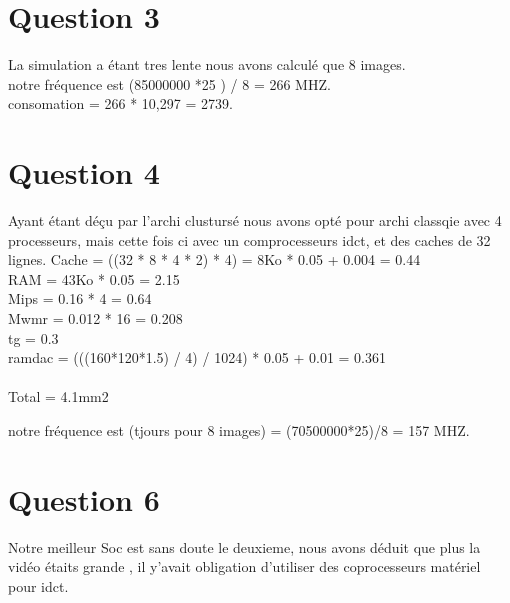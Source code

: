 \documentclass[12pt]{article}
\begin{document}
\section*{Question 3}
La simulation a étant tres lente nous avons calculé que 8 images.\\
	notre fréquence est (85000000 *25 ) / 8 = 266 MHZ.\\
	consomation = 266 * 10,297 = 2739.
	
\section*{Question 4}
Ayant étant déçu par l'archi clustursé nous avons opté pour archi classqie avec 4 processeurs, mais cette fois ci avec un comprocesseurs idct, et des caches de 32 lignes.
Cache = ((32 * 8 * 4 * 2) * 4) = 8Ko * 0.05 + 0.004 = 0.44 \\
RAM = 43Ko * 0.05 = 2.15\\
Mips = 0.16 * 4 = 0.64\\
Mwmr = 0.012 * 16 = 0.208\\
tg = 0.3\\
ramdac = (((160*120*1.5) / 4) / 1024) * 0.05 + 0.01 = 0.361\\
\\
Total = 4.1mm2

notre fréquence est (tjours pour 8 images) = (70500000*25)/8 = 157 MHZ.
\section*{Question 6}
Notre meilleur Soc est sans doute le deuxieme, nous avons déduit que plus la vidéo étaits grande , il y'avait obligation d'utiliser des coprocesseurs matériel pour idct.
\end{document}
